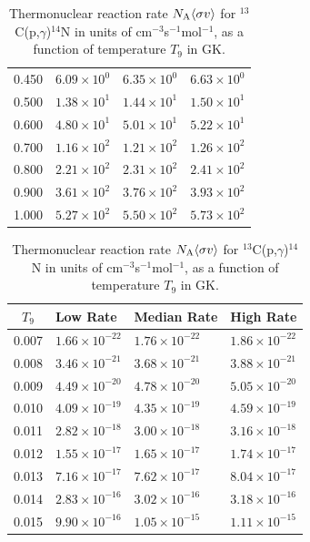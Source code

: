 \documentclass[onecolumn,notitlepage]{revtex4-1}
\begin{document}
\begin{table}[ht]
\begin{minipage}{0.45\linewidth}
\begin{tabular}{| c | l | l | l |}
0.450  & $6.09 \times 10^{0}$   & $6.35 \times 10^{0}$   & $6.63 \times 10^{0}$   \\
0.500   & $1.38 \times 10^{1}$   & $1.44 \times 10^{1}$   & $1.50 \times 10^{1}$   \\
0.600   & $4.80 \times 10^{1}$   & $5.01 \times 10^{1}$   & $5.22 \times 10^{1}$   \\
0.700   & $1.16 \times 10^{2}$   & $1.21 \times 10^{2}$   & $1.26 \times 10^{2}$   \\
0.800   & $2.21 \times 10^{2}$   & $2.31 \times 10^{2}$   & $2.41 \times 10^{2}$   \\
0.900   & $3.61 \times 10^{2}$   & $3.76 \times 10^{2}$   & $3.93 \times 10^{2}$   \\
1.000   & $5.27 \times 10^{2}$   & $5.50 \times 10^{2}$   & $5.73 \times 10^{2}$   \\
\hline
\end{tabular}
\end{minipage}
\hfill
\begin{minipage}{0.45\linewidth}
\caption{Thermonuclear reaction rate $N_{\rm A}\langle \sigma v\rangle$ for $^{13}$C(p,$\gamma$)$^{14}$N in units of  cm$^{-3}$s$^{-1}$mol$^{-1}$, as a function of temperature $T_9$ in GK.}
\label{tab:rr:13c}
\begin{tabular}{| c | l | l | l |}
\hline
$T_9$ & Low Rate & Median Rate & High Rate \\
\hline
\hline
0.007 & $1.66 \times 10^{-22}$ & $1.76 \times 10^{-22}$ & $1.86 \times 10^{-22}$ \\
0.008 & $3.46 \times 10^{-21}$ & $3.68 \times 10^{-21}$ & $3.88 \times 10^{-21}$ \\
0.009 & $4.49 \times 10^{-20}$ & $4.78 \times 10^{-20}$ & $5.05 \times 10^{-20}$ \\
0.010  & $4.09 \times 10^{-19}$ & $4.35 \times 10^{-19}$ & $4.59 \times 10^{-19}$ \\
0.011 & $2.82 \times 10^{-18}$ & $3.00 \times 10^{-18}$ & $3.16 \times 10^{-18}$ \\
0.012 & $1.55 \times 10^{-17}$ & $1.65 \times 10^{-17}$ & $1.74 \times 10^{-17}$ \\
0.013 & $7.16 \times 10^{-17}$ & $7.62 \times 10^{-17}$ & $8.04 \times 10^{-17}$ \\
0.014 & $2.83 \times 10^{-16}$ & $3.02 \times 10^{-16}$ & $3.18 \times 10^{-16}$ \\
0.015 & $9.90 \times 10^{-16}$ & $1.05 \times 10^{-15}$ & $1.11 \times 10^{-15}$ \\

\end{tabular}
\end{minipage}
\end{table}
\end{document}
